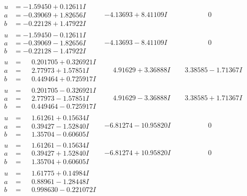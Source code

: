\documentclass[1p]{elsarticle_modified}
\theoremstyle{definition}
\begin{document}
$$\begin{array}{c|c|c}
\begin{aligned}
u &= -1.59450 + 0.12611 I \\
a &= -0.39069 + 1.82656 I \\
b &= -0.22128 + 1.47922 I\end{aligned}
 & -4.13693 + 8.41109 I & \phantom{-0.000000 } 0 \\ \hline\begin{aligned}
u &= -1.59450 - 0.12611 I \\
a &= -0.39069 - 1.82656 I \\
b &= -0.22128 - 1.47922 I\end{aligned}
 & -4.13693 - 8.41109 I & \phantom{-0.000000 } 0 \\ \hline\begin{aligned}
u &= \phantom{-}0.201705 + 0.326921 I \\
a &= \phantom{-}2.77973 + 1.57851 I \\
b &= \phantom{-}0.449464 + 0.725917 I\end{aligned}
 & \phantom{-}4.91629 + 3.36888 I & \phantom{-}3.38585 - 1.71367 I \\ \hline\begin{aligned}
u &= \phantom{-}0.201705 - 0.326921 I \\
a &= \phantom{-}2.77973 - 1.57851 I \\
b &= \phantom{-}0.449464 - 0.725917 I\end{aligned}
 & \phantom{-}4.91629 - 3.36888 I & \phantom{-}3.38585 + 1.71367 I \\ \hline\begin{aligned}
u &= \phantom{-}1.61261 + 0.15634 I \\
a &= \phantom{-}0.39427 - 1.52840 I \\
b &= \phantom{-}1.35704 - 0.60605 I\end{aligned}
 & -6.81274 - 10.95820 I & \phantom{-0.000000 } 0 \\ \hline\begin{aligned}
u &= \phantom{-}1.61261 - 0.15634 I \\
a &= \phantom{-}0.39427 + 1.52840 I \\
b &= \phantom{-}1.35704 + 0.60605 I\end{aligned}
 & -6.81274 + 10.95820 I & \phantom{-0.000000 } 0 \\ \hline\begin{aligned}
u &= \phantom{-}1.61775 + 0.14984 I \\
a &= \phantom{-}0.88961 - 1.28448 I \\
b &= \phantom{-}0.998630 - 0.221072 I\end{aligned}

\end{array}$$
\end{document}
